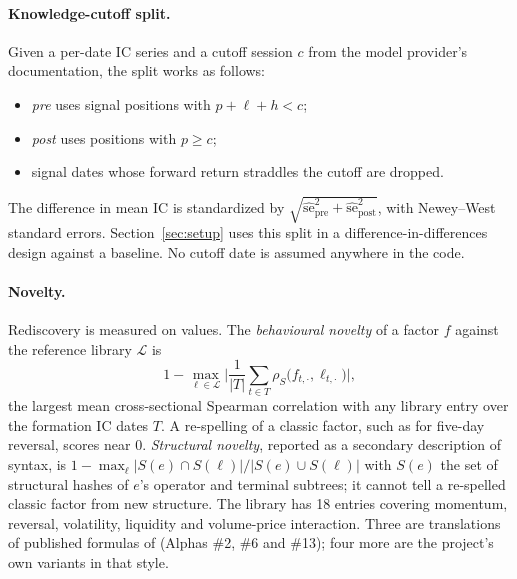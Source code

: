 \paragraph{Knowledge-cutoff split.} Given a per-date IC series and a cutoff
session $c$ from the model provider's documentation, the split works as
follows:
\begin{itemize}
  \item \emph{pre} uses signal positions with $p+\ell+h<c$;
  \item \emph{post} uses positions with $p\ge c$;
  \item signal dates whose forward return straddles the cutoff are dropped.
\end{itemize}
The difference in mean IC is standardized by
$\sqrt{\widehat{\mathrm{se}}_{\mathrm{pre}}^2+\widehat{\mathrm{se}}_{\mathrm{post}}^2}$,
with Newey--West standard errors. Section~\ref{sec:setup} uses this split in
a difference-in-differences design against a baseline. No cutoff date is
assumed anywhere in the code.

\paragraph{Novelty.} Rediscovery is measured on values. The
\emph{behavioural novelty} of a factor $f$ against the reference library
$\mathcal{L}$ is
\[
1-\max_{\ell\in\mathcal{L}}\Big|\frac{1}{|T|}\sum_{t\in T}\rho_S\big(f_{t,\cdot},\ell_{t,\cdot}\big)\Big|,
\]
the largest mean cross-sectional Spearman correlation with any library
entry over the formation IC dates $T$. A re-spelling of a classic factor,
such as  for five-day reversal, scores near
$0$. \emph{Structural novelty}, reported as a secondary description of
syntax, is $1-\max_{\ell}|S(e)\cap S(\ell)|/|S(e)\cup S(\ell)|$ with $S(e)$ the
set of structural hashes of $e$'s operator and terminal subtrees; it cannot
tell a re-spelled classic factor from new structure. The library has 18
entries covering momentum, reversal, volatility, liquidity and volume-price
interaction. Three are translations of published formulas of
\citet{kakushadze2016alphas} (Alphas \#2, \#6 and \#13); four more are
the project's own variants in that style.
